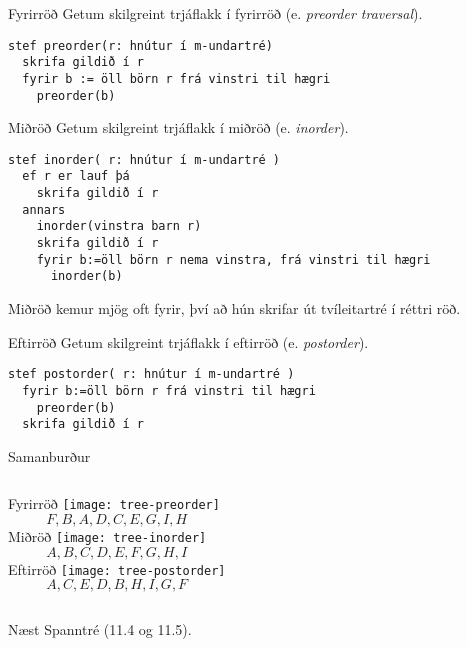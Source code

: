 \documentclass[handout]{beamer}
\begin{document}
\begin{frame}[fragile]{Fyrirröð}
Getum skilgreint trjáflakk í fyrirröð (e. \emph{preorder traversal}).

\begin{verbatim}
stef preorder(r: hnútur í m-undartré)
  skrifa gildið í r
  fyrir b := öll börn r frá vinstri til hægri
    preorder(b)
\end{verbatim}
\end{frame}

\begin{frame}[fragile]{Miðröð}
Getum skilgreint trjáflakk í miðröð (e. \emph{inorder}).

\begin{verbatim}
stef inorder( r: hnútur í m-undartré )
  ef r er lauf þá
    skrifa gildið í r
  annars
    inorder(vinstra barn r)
    skrifa gildið í r
    fyrir b:=öll börn r nema vinstra, frá vinstri til hægri
      inorder(b)
\end{verbatim}
Miðröð kemur mjög oft fyrir, því að hún skrifar út tvíleitartré í réttri röð.
\end{frame}

\begin{frame}[fragile]{Eftirröð}
Getum skilgreint trjáflakk í eftirröð (e. \emph{postorder}).

\begin{verbatim}
stef postorder( r: hnútur í m-undartré )
  fyrir b:=öll börn r frá vinstri til hægri
    preorder(b)
  skrifa gildið í r
\end{verbatim}
\end{frame}

\begin{frame}{Samanburður}
\begin{columns}
Fyrirröð
\texttt{[image: tree-preorder]}
\[F, B, A, D, C, E, G, I, H\]
Miðröð
\texttt{[image: tree-inorder]}
\[A, B, C, D, E, F, G, H, I\]
Eftirröð
\texttt{[image: tree-postorder]}
\[A, C, E, D, B, H, I, G, F\]
\end{columns}

\end{frame}



\begin{frame}{Næst}
Spanntré (11.4 og 11.5).
\end{frame}
\end{document}
